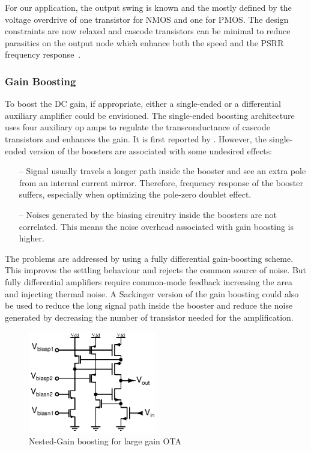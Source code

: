 For our application, the output swing is known and the mostly defined by the voltage overdrive of one transistor for NMOS and one for PMOS\@. The design constraints are now relaxed and cascode transistors can be minimal to reduce parasitics on the output node which enhance both the speed and the PSRR frequency response~\cite{Ribner1984}.

\subsubsection{Gain Boosting}
To boost the DC gain, if appropriate, either a single-ended or a differential auxiliary amplifier could be envisioned. The single-ended boosting architecture uses four auxiliary op amps to regulate the transconductance of cascode transistors and enhances the gain. It is first reported by \cite{Bult1990}. However, the single-ended version of the boosters are associated with some undesired effects:
\begin{itemize}
    \itemsep-0.5em
    \item[--] Signal usually travels a longer path inside the booster and see an extra pole from an internal current mirror. Therefore, frequency response of the booster suffers, especially when optimizing the pole-zero doublet effect.
    \item[--] Noises generated by the biasing circuitry inside the boosters are not correlated. This means the noise overhead associated with gain boosting is higher.
\end{itemize}
The problems are addressed by using a fully differential gain-boosting scheme. This improves the settling behaviour and rejects the common source of noise. But fully differential amplifiers require common-mode feedback increasing the area and injecting thermal noise. A Sackinger version of the gain boosting could also be used to reduce the long signal path inside the booster and reduce the noise generated by decreasing the number of transistor needed for the amplification.

\begin{figure}[htp]
    \centering
    \includegraphics[width=0.5\textwidth]{Chapter7/Figs/gain-boosting.ps}
    \caption{Nested-Gain boosting for large gain OTA}
    \label{fig:nmos-nested-gain-boosting}
\end{figure}

